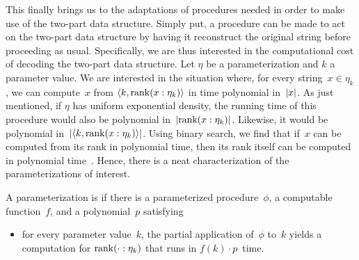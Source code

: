 This finally brings us to the adaptations of procedures needed in order to make use of the two-part data structure.
Simply put, a procedure can be made to act on the two-part data structure by having it reconstruct the original string before proceeding as usual.
Specifically, we are thus interested in the computational cost of decoding the two-part data structure.
Let $\eta$ be a parameterization and $k$ a parameter value.
We are interested in the situation where, for every string~$x \in \eta_k$, we can compute~$x$ from ${\langle k, \operatorname{rank}(x : \eta_k)\rangle}$ in time polynomial in~${\lvert x\rvert}$.
As just mentioned, if $\eta$ has uniform exponential density, the running time of this procedure would also be polynomial in~${\lvert\operatorname{rank}(x : \eta_k)\rvert}$.
Likewise, it would be polynomial in~${\lvert{\langle k, \operatorname{rank}(x : \eta_k)\rangle}\rvert}$.
Using binary search, we find that if~$x$ can be computed from its rank in polynomial time, then its rank itself can be computed in polynomial time~\parencite[Theorem~6.1]{hemachandra1990complexity}.
Hence, there is a neat characterization of the parameterizations of interest.
\begin{definition}
  A parameterization is  if there is a parameterized procedure~$\phi$, a computable function~$f$, and a polynomial~$p$ satisfying
  \begin{itemize}
  \item for every parameter value~$k$, the partial application of~$\phi$ to~$k$ yields a computation for $\operatorname{rank}(\cdot : \eta_k)$ that runs in $f(k) \cdot p$~time.
  \end{itemize}
\end{definition}

